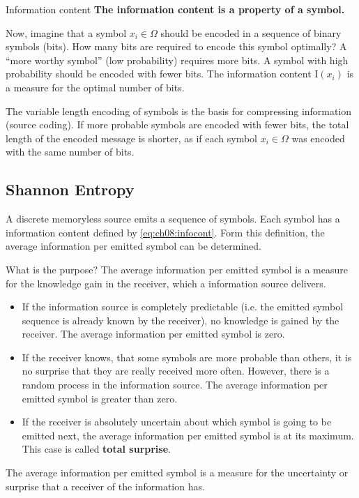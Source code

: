 \begin{refsection}
\begin{definition}{Information content}
	\textbf{The information content is a property of a symbol.}
\end{definition}

Now, imagine that a symbol $x_i \in \Omega$ should be encoded in a sequence of binary symbols (bits). How many bits are required to encode this symbol optimally? A ``more worthy symbol'' (low probability) requires more bits. A symbol with high probability should be encoded with fewer bits. The information content $\mathrm{I}(x_i)$ is a measure for the optimal number of bits.

The variable length encoding of symbols is the basis for compressing information (source coding). If more probable symbols are encoded with fewer bits, the total length of the encoded message is shorter, as if each symbol $x_i \in \Omega$ was encoded with the same number of bits.

\subsection{Shannon Entropy}

A discrete memoryless source emits a sequence of symbols. Each symbol has a information content defined by \eqref{eq:ch08:infocont}. Form this definition, the average information per emitted symbol can be determined.

What is the purpose? The average information per emitted symbol is a measure for the knowledge gain in the receiver, which a information source delivers.
\begin{itemize}
	\item If the information source is completely predictable (i.e. the emitted symbol sequence is already known by the receiver), no knowledge is gained by the receiver. The average information per emitted symbol is zero.
	\item If the receiver knows, that some symbols are more probable than others, it is no surprise that they are really received more often. However, there is a random process in the information source. The average information per emitted symbol is greater than zero.
	\item If the receiver is absolutely uncertain about which symbol is going to be emitted next, the average information per emitted symbol is at its maximum. This case is called  \textbf{total surprise}.
\end{itemize}
The average information per emitted symbol is a measure for the uncertainty or surprise that a receiver of the information has.


\end{refsection}

